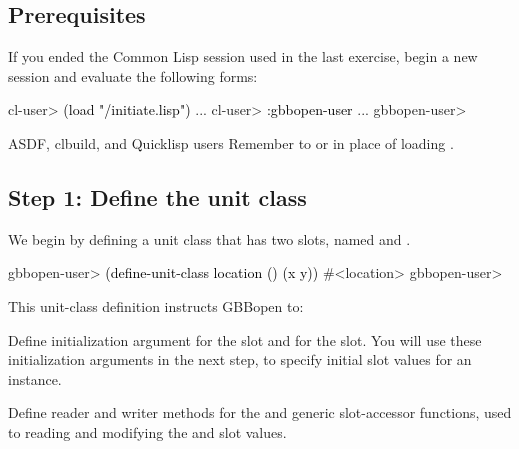 \documentclass[10pt,twoside,english,pdftex]{article}
\begin{document}
\fndocrule

\subsection*{Prerequisites}

%
%
If you ended the Common Lisp session used in the last exercise, begin a new
session and evaluate the following forms:
%
\W\supp
\begin{example}
\textcolor{darkergray}{%
  cl-user> \textcolor{black}{(load "/initiate.lisp")}
     ...
  cl-user> \textcolor{black}{:gbbopen-user}
     ...
  gbbopen-user>}
\end{example}

%
%
\begin{notebox}{ASDF, clbuild, and Quicklisp users}
  Remember to  or
   in place of loading
  .
\end{notebox}

\subsection*{Step 1: Define the  unit class}

%
%
%
We begin by defining a unit class  that has two slots,
named  and .
%
\W\supp
\begin{example}
\textcolor{darkergray}{%
  gbbopen-user> \textcolor{black}{(define-unit-class location ()
                  (x y))}
  #<location>
  gbbopen-user>}
\end{example}

This unit-class definition instructs GBBopen to:
%
\begin{tightitemize}
\item Define initialization argument  for the  slot
  and  for the  slot.  You will use these
  initialization arguments in the next step, to specify initial slot
  values for an instance.
\item Define reader and writer methods for the  and
   generic slot-accessor functions, used to reading and
  modifying the  and  slot values.
\end{tightitemize}
\end{document}
